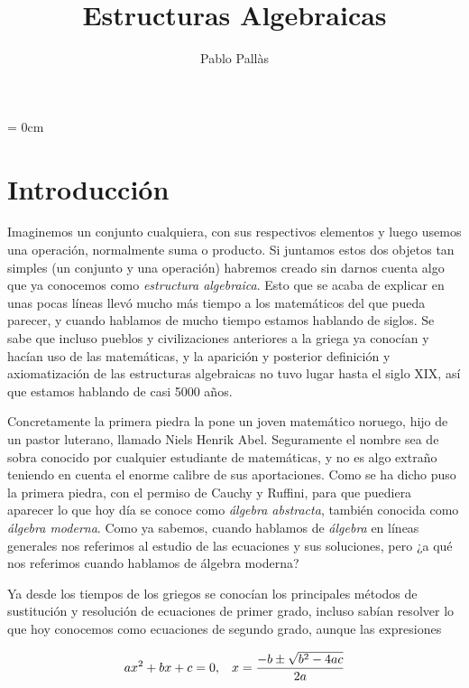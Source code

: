 \documentclass[12pt]{article}
\author{Pablo Pallàs}
\title{Estructuras Algebraicas}
\begin{document}
\rmfamily
\maketitle
\vspace{1.5cm}
\tableofcontents
\parindent= 0cm
\newpage
\section{Introducción}

Imaginemos un conjunto cualquiera, con sus respectivos elementos y luego usemos una operación, normalmente suma o producto. Si juntamos estos dos objetos tan simples (un conjunto y una operación) habremos creado sin darnos cuenta algo que ya conocemos como \textit{estructura algebraica}. Esto que se acaba de explicar en unas pocas líneas llevó mucho más tiempo a los matemáticos del que pueda parecer, y cuando hablamos de mucho tiempo estamos hablando de siglos. Se sabe que incluso pueblos y civilizaciones anteriores a la griega ya conocían y hacían uso de las matemáticas, y la aparición y posterior definición y axiomatización de las estructuras algebraicas no tuvo lugar hasta el siglo XIX, así que estamos hablando de casi 5000 años.

Concretamente la primera piedra la pone un joven matemático noruego, hijo de un pastor luterano, llamado Niels Henrik Abel. Seguramente el nombre sea de sobra conocido por cualquier estudiante de matemáticas, y no es algo extraño teniendo en cuenta el enorme calibre de sus aportaciones. Como se ha dicho puso la primera piedra, con el permiso de Cauchy y Ruffini, para que puediera aparecer lo que hoy día se conoce como \textit{álgebra abstracta}, también conocida como \textit{álgebra moderna}. Como ya sabemos, cuando hablamos de \textit{álgebra} en líneas generales nos referimos al estudio de las ecuaciones y sus soluciones, pero ¿a qué nos referimos cuando hablamos de álgebra moderna?

Ya desde los tiempos de los griegos se conocían los principales métodos de sustitución y resolución de ecuaciones de primer grado, incluso sabían resolver lo que hoy conocemos como ecuaciones de segundo grado, aunque las expresiones 

$$ax^{2}+bx +c=0, \hspace{0.3cm} x=\dfrac{-b \pm \sqrt{b^{2}-4ac}}{2a}$$ 
\end{document}
